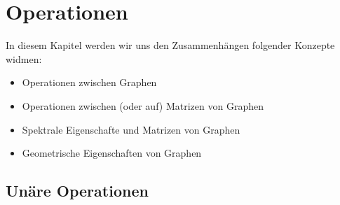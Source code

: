 \chapter{Operationen} \label{chap:operations}

    In diesem Kapitel werden wir uns den Zusammenhängen folgender Konzepte widmen:

    \begin{itemize}
        \item Operationen zwischen Graphen
        \item Operationen zwischen (oder auf) Matrizen von Graphen
        \item Spektrale Eigenschafte und Matrizen von Graphen
        \item Geometrische Eigenschaften von Graphen
    \end{itemize}

    \section{Unäre Operationen}

